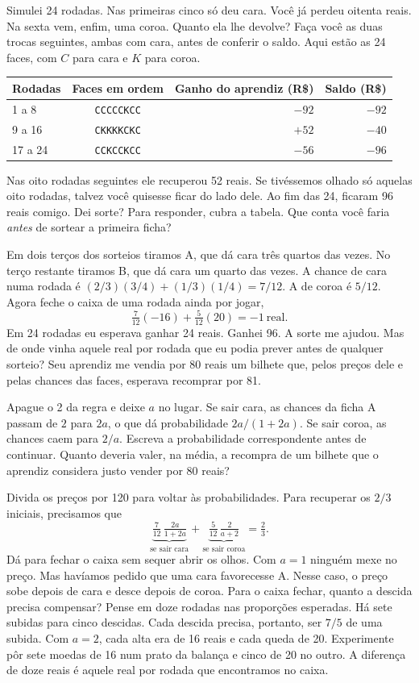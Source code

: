Simulei 24 rodadas. Nas primeiras cinco só deu cara. Você já perdeu oitenta reais. Na sexta vem, enfim, uma coroa. Quanto ela lhe devolve? Faça você as duas trocas seguintes, ambas com cara, antes de conferir o saldo. Aqui estão as 24 faces, com $C$ para cara e $K$ para coroa.
\begin{center}
{\small
\begin{tabular}{@{}lcrr@{}}
\toprule
Rodadas & Faces em ordem & Ganho do aprendiz (R\$) & Saldo (R\$) \\
\midrule
1 a 8 & \texttt{CCCCCKCC} & $-92$ & $-92$ \\
9 a 16 & \texttt{CKKKKCKC} & $+52$ & $-40$ \\
17 a 24 & \texttt{CCKCCKCC} & $-56$ & $-96$ \\
\bottomrule
\end{tabular}}
\end{center}
Nas oito rodadas seguintes ele recuperou 52 reais. Se tivéssemos olhado só aquelas oito rodadas, talvez você quisesse ficar do lado dele. Ao fim das 24, ficaram 96 reais comigo. Dei sorte? Para responder, cubra a tabela. Que conta você faria \emph{antes} de sortear a primeira ficha?

Em dois terços dos sorteios tiramos A, que dá cara três quartos das vezes. No terço restante tiramos B, que dá cara um quarto das vezes. A chance de cara numa rodada é $(2/3)(3/4)+(1/3)(1/4)=7/12$. A de coroa é $5/12$. Agora feche o caixa de uma rodada ainda por jogar,
\[
    \tfrac{7}{12}(-16)+\tfrac{5}{12}(20)=-1\ \text{real}.
\]
Em 24 rodadas eu esperava ganhar 24 reais. Ganhei 96. A sorte me ajudou. Mas de onde vinha aquele real por rodada que eu podia prever antes de qualquer sorteio? Seu aprendiz me vendia por 80 reais um bilhete que, pelos preços dele e pelas chances das faces, esperava recomprar por 81.

Apague o 2 da regra e deixe $a$ no lugar. Se sair cara, as chances da ficha A passam de $2$ para $2a$, o que dá probabilidade $2a/(1+2a)$. Se sair coroa, as chances caem para $2/a$. Escreva a probabilidade correspondente antes de continuar. Quanto deveria valer, na média, a recompra de um bilhete que o aprendiz considera justo vender por 80 reais?

Divida os preços por 120 para voltar às probabilidades. Para recuperar os $2/3$ iniciais, precisamos que
\[
\underbrace{\tfrac{7}{12}\,\tfrac{2a}{1+2a}}_{\text{se sair cara}}
+\underbrace{\tfrac{5}{12}\,\tfrac{2}{a+2}}_{\text{se sair coroa}}
=\tfrac{2}{3}.
\]
Dá para fechar o caixa sem sequer abrir os olhos. Com $a=1$ ninguém mexe no preço. Mas havíamos pedido que uma cara favorecesse A. Nesse caso, o preço sobe depois de cara e desce depois de coroa. Para o caixa fechar, quanto a descida precisa compensar? Pense em doze rodadas nas proporções esperadas. Há sete subidas para cinco descidas. Cada descida precisa, portanto, ser $7/5$ de uma subida. Com $a=2$, cada alta era de 16 reais e cada queda de 20. Experimente pôr sete moedas de 16 num prato da balança e cinco de 20 no outro. A diferença de doze reais é aquele real por rodada que encontramos no caixa.

